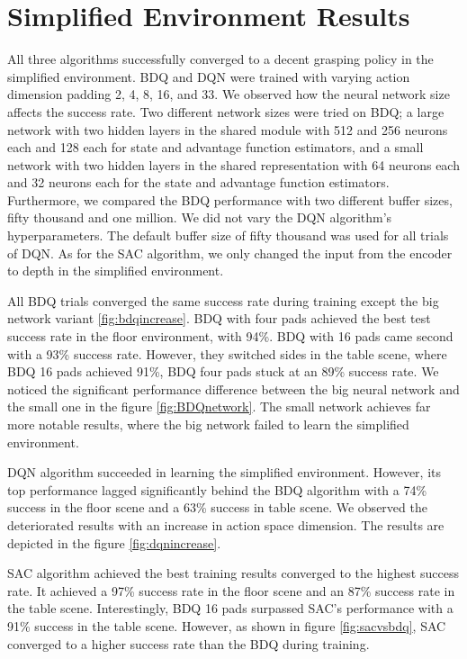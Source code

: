 \section{Simplified Environment Results}

All three algorithms successfully converged to a decent grasping policy in the simplified environment. BDQ and DQN  were trained with varying action dimension padding 2, 4, 8, 16, and 33.
We observed how the neural network size affects the success rate. Two different network sizes were tried on BDQ; a large network with two hidden layers in the shared module with 512 and 256 neurons each and 128 each for state and advantage function estimators, and a small network with two hidden layers in the shared representation with 64 neurons each and 32 neurons each for the state and advantage function estimators. Furthermore, we compared the BDQ performance with two different buffer sizes, fifty thousand and one million. We did not vary the DQN algorithm's hyperparameters. The default buffer size of fifty thousand was used for all trials of DQN.
As for the SAC algorithm, we only changed the input from the encoder to depth in the simplified environment.

All BDQ trials converged the same success rate during training except the big network variant \ref{fig:bdqincrease}. BDQ with four pads achieved the best test success rate in the floor environment, with 94\%. BDQ with 16 pads came second with a 93\% success rate. However, they switched sides in the table scene, where BDQ 16 pads achieved 91\%, BDQ four pads stuck at an 89\% success rate. We noticed the significant performance difference between the big neural network and the small one in the figure \ref{fig:BDQnetwork}. The small network achieves far more notable results, where the big network failed to learn the simplified environment.

DQN algorithm succeeded in learning the simplified environment. However, its top performance lagged significantly behind the BDQ algorithm with a 74\% success in the floor scene and a 63\% success in table scene. We observed the deteriorated results with an increase in action space dimension. The results are depicted in the figure \ref{fig:dqnincrease}.

SAC algorithm achieved the best training results converged to the highest success rate. It achieved a 97\% success rate in the floor scene and an 87\% success rate in the table scene. Interestingly, BDQ 16 pads surpassed SAC's performance with a 91\% success in the table scene. However, as shown in figure \ref{fig:sacvsbdq}, SAC converged to a higher success rate than the BDQ during training.

